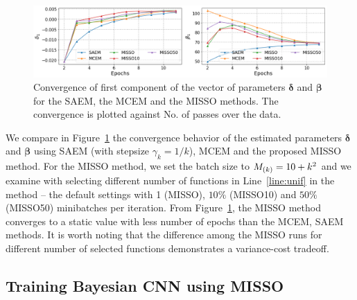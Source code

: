 \documentclass[11pt]{article}
\theoremstyle{t}
\begin{document}
\begin{figure}[H]
\includegraphics[width=\textwidth]{pic_paper/traumabasenoexp.png}\vspace{-.2cm}
\caption{Convergence of first component of the vector of parameters ${\bm \delta}$ and ${\bm \beta}$ for the SAEM, the MCEM and the MISSO methods. The convergence is plotted against No. of passes over the data.}\vspace{-.2cm}
\label{fig:misso_trauma}
\end{figure}
\vspace{-.2cm}
We compare in Figure~\ref{fig:misso_trauma} the convergence behavior of the estimated parameters $\bm{\delta}$ and $\bm{\beta}$ using SAEM \citep{delyon1999} (with stepsize $\gamma_k = 1/k$), MCEM \citep{wei1990mcem}  and the proposed MISSO method.
For the MISSO method, we set the batch size to $\Bsize{k} = 10 + k^2$ and we examine with selecting different number of functions in Line~\ref{line:unif} in the method -- the default settings with 1 (MISSO), $10\%$ (MISSO10) and $50\%$ (MISSO50) minibatches per iteration.
From Figure~\ref{fig:misso_trauma}, the MISSO method converges to a static value with less number of epochs than the MCEM, SAEM methods.
It is worth noting that the difference among the MISSO runs for different number of selected functions demonstrates a variance-cost tradeoff.

\vspace{-0.05in}
\subsection{Training Bayesian CNN using MISSO}
\vspace{-0.05in}
\end{document}
